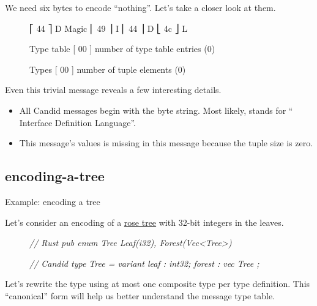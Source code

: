 \documentclass{article}
\begin{document}
We need six bytes to encode ``nothing''.
Let's take a closer look at them.

\begin{figure}
\begin{code}[ascii]
           ⎡ 44 ⎤ D
    Magic  ⎢ 49 ⎥ I
           ⎢ 44 ⎥ D
           ⎣ 4c ⎦ L

Type table [ 00 ] number of type table entries (0)

    Types  [ 00 ] number of tuple elements (0)
\end{code}
\end{figure}

Even this trivial message reveals a few interesting details.

\begin{itemize}
    \item
    All Candid messages begin with the  byte string.
    Most likely,  stands for `` Interface Definition Language''.
    \item
    This message's values is missing in this message because the tuple size is zero.
\end{itemize}

\subsection{encoding-a-tree}{Example: encoding a tree}

Let's consider an encoding of a \href{https://en.wikipedia.org/wiki/Rose_tree}{rose tree} with 32-bit integers in the leaves.

\begin{figure}
\begin{code}[rust]
\em{// Rust}
pub enum Tree { Leaf(i32), Forest(Vec<Tree>) }
\end{code}
\begin{code}[candid]
\em{// Candid}
type Tree = variant { leaf : int32; forest : vec Tree };
\end{code}
\end{figure}

Let's rewrite the  type using at most one composite type per type definition.
This ``canonical'' form will help us better understand the message type table.
\end{document}
